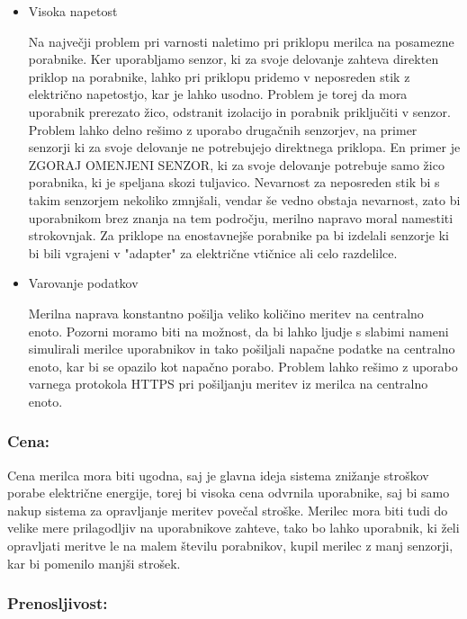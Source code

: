 \documentclass[12pt,a4paper,titlepage,openany]{report}
\begin{document}
\begin{itemize}
\item Visoka napetost

Na največji problem pri varnosti naletimo pri priklopu merilca na posamezne porabnike. Ker uporabljamo senzor, ki za svoje delovanje zahteva direkten priklop na porabnike, lahko pri priklopu pridemo v neposreden stik z električno napetostjo, kar je lahko usodno. Problem je torej da mora uporabnik prerezato žico, odstranit izolacijo in porabnik priključiti v senzor. Problem lahko delno rešimo z uporabo drugačnih senzorjev, na primer senzorji ki za svoje delovanje ne potrebujejo direktnega priklopa. En primer je ZGORAJ OMENJENI SENZOR, ki za svoje delovanje potrebuje samo žico porabnika, ki je speljana skozi tuljavico. Nevarnost za neposreden stik bi s takim senzorjem nekoliko zmnjšali, vendar še vedno obstaja nevarnost, zato bi uporabnikom brez znanja na tem področju, merilno napravo moral namestiti strokovnjak. Za priklope na enostavnejše porabnike pa bi izdelali senzorje ki bi bili vgrajeni v "adapter" za električne vtičnice ali celo razdelilce.

\item Varovanje podatkov

Merilna naprava konstantno pošilja veliko količino meritev na centralno enoto. Pozorni moramo biti na možnost, da bi lahko ljudje s slabimi nameni simulirali merilce uporabnikov in tako pošiljali napačne podatke na centralno enoto, kar bi se opazilo kot napačno porabo. Problem lahko rešimo z uporabo varnega protokola HTTPS pri pošiljanju meritev iz merilca na centralno enoto.

\end{itemize}


\subsubsection{Cena:}

Cena merilca mora biti ugodna, saj je glavna ideja sistema znižanje stroškov porabe električne energije, torej bi visoka cena odvrnila uporabnike, saj bi samo nakup sistema za opravljanje meritev povečal stroške. Merilec mora biti tudi do velike mere prilagodljiv na uporabnikove zahteve, tako bo lahko uporabnik, ki želi opravljati meritve le na malem številu porabnikov, kupil merilec z manj senzorji, kar bi pomenilo manjši strošek.

\subsubsection{Prenosljivost:}
\end{document}
